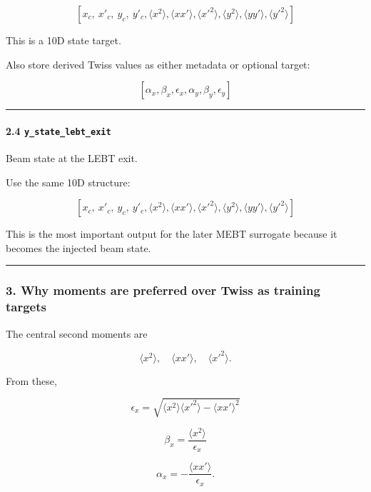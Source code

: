 \documentclass[
]{article}
\begin{document}
\[
[
x_c,\ x'_c,\ y_c,\ y'_c,
\langle x^2\rangle,\langle xx'\rangle,\langle x'^2\rangle,
\langle y^2\rangle,\langle yy'\rangle,\langle y'^2\rangle
]
\]

This is a 10D state target.

Also store derived Twiss values as either metadata or optional target:

\[
[
\alpha_x,\beta_x,\epsilon_x,
\alpha_y,\beta_y,\epsilon_y
]
\]

\begin{center}\rule{0.5\linewidth}{0.5pt}\end{center}

\hypertarget{y_state_lebt_exit}{%
\paragraph{\texorpdfstring{2.4
\texttt{y\_state\_lebt\_exit}}{2.4 y\_state\_lebt\_exit}}\label{y_state_lebt_exit}}

Beam state at the LEBT exit.

Use the same 10D structure:

\[
[
x_c,\ x'_c,\ y_c,\ y'_c,
\langle x^2\rangle,\langle xx'\rangle,\langle x'^2\rangle,
\langle y^2\rangle,\langle yy'\rangle,\langle y'^2\rangle
]
\]

This is the most important output for the later MEBT surrogate because
it becomes the injected beam state.

\begin{center}\rule{0.5\linewidth}{0.5pt}\end{center}

\hypertarget{why-moments-are-preferred-over-twiss-as-training-targets}{%
\subsubsection{3. Why moments are preferred over Twiss as training
targets}\label{why-moments-are-preferred-over-twiss-as-training-targets}}

The central second moments are

\[
\langle x^2\rangle,\quad
\langle xx'\rangle,\quad
\langle x'^2\rangle.
\]

From these,

\[
\epsilon_x
=
\sqrt{
\langle x^2\rangle\langle x'^2\rangle
-
\langle xx'\rangle^2
}
\]

\[
\beta_x
=
\frac{\langle x^2\rangle}{\epsilon_x}
\]

\[
\alpha_x
=
-\frac{\langle xx'\rangle}{\epsilon_x}.
\]
\end{document}
